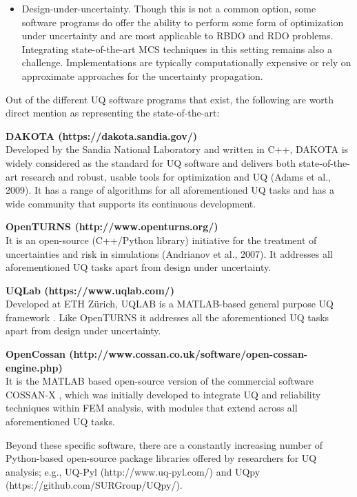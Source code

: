 \begin{itemize}
    \item Design-under-uncertainty. Though this is not a common option, some software programs do offer the ability to perform some form of optimization under uncertainty and are most applicable to RBDO and RDO problems. Integrating state-of-the-art MCS techniques in this setting remains also a challenge. Implementations are typically computationally expensive or rely on approximate approaches for the uncertainty propagation.
\end{itemize}

\noindent Out of the different UQ software programs that exist, the following are worth direct mention as representing the state-of-the-art: 
\newline

\noindent\textbf{DAKOTA (https://dakota.sandia.gov/)} \\Developed by the Sandia National Laboratory and written in C++, DAKOTA is widely considered as the standard for UQ software and delivers both state-of-the-art research and robust, usable tools for optimization and UQ (Adams et al., 2009). It has a range of algorithms for all aforementioned UQ tasks and has a wide community that supports its continuous development. 
\newline

\noindent\textbf{OpenTURNS (http://www.openturns.org/)} \\It is an open-source (C++/Python library) initiative for the treatment of uncertainties and risk in simulations (Andrianov et al., 2007). It addresses all aforementioned UQ tasks apart from design under uncertainty. 
\newline

\noindent\textbf{UQLab (https://www.uqlab.com/)} \\Developed at ETH Zürich, UQLAB is a MATLAB-based general purpose UQ framework \citep{marelli2014uqlab}. Like OpenTURNS it addresses all the aforementioned UQ tasks apart from design under uncertainty. 
\newline

\noindent\textbf{OpenCossan (http://www.cossan.co.uk/software/open-cossan-engine.php)} \\It is the MATLAB based open-source version of the commercial software COSSAN-X \citep{patelli2017cossan}, which was initially developed to integrate UQ and reliability techniques within FEM analysis, with modules that extend across all aforementioned UQ tasks.

Beyond these specific software, there are a constantly increasing number of Python-based open-source package libraries offered by researchers for UQ analysis; e.g., UQ-Pyl (http://www.uq-pyl.com/) and UQpy (https://github.com/SURGroup/UQpy/).
